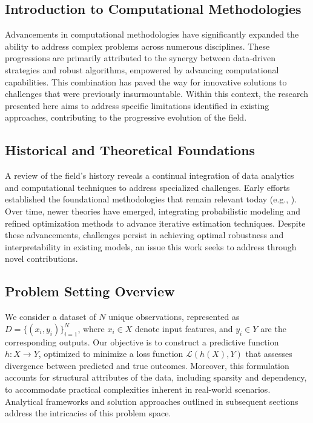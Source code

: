 \documentclass{article} %
\begin{document}
\subsection{Introduction to Computational Methodologies}

Advancements in computational methodologies have significantly expanded the ability to address complex problems across numerous disciplines. These progressions are primarily attributed to the synergy between data-driven strategies and robust algorithms, empowered by advancing computational capabilities. This combination has paved the way for innovative solutions to challenges that were previously insurmountable. Within this context, the research presented here aims to address specific limitations identified in existing approaches, contributing to the progressive evolution of the field.

\subsection{Historical and Theoretical Foundations}

A review of the field's history reveals a continual integration of data analytics and computational techniques to address specialized challenges. Early efforts established the foundational methodologies that remain relevant today (e.g., \cite{early_work}). Over time, newer theories have emerged, integrating probabilistic modeling and refined optimization methods to advance iterative estimation techniques. Despite these advancements, challenges persist in achieving optimal robustness and interpretability in existing models, an issue this work seeks to address through novel contributions.

\subsection{Problem Setting Overview}

We consider a dataset of $N$ unique observations, represented as $D = \{(x_i, y_i)\}_{i=1}^N$, where $x_i \in X$ denote input features, and $y_i \in Y$ are the corresponding outputs. Our objective is to construct a predictive function $h: X \to Y$, optimized to minimize a loss function $\mathcal{L}(h(X), Y)$ that assesses divergence between predicted and true outcomes. Moreover, this formulation accounts for structural attributes of the data, including sparsity and dependency, to accommodate practical complexities inherent in real-world scenarios. Analytical frameworks and solution approaches outlined in subsequent sections address the intricacies of this problem space.
\end{document}
